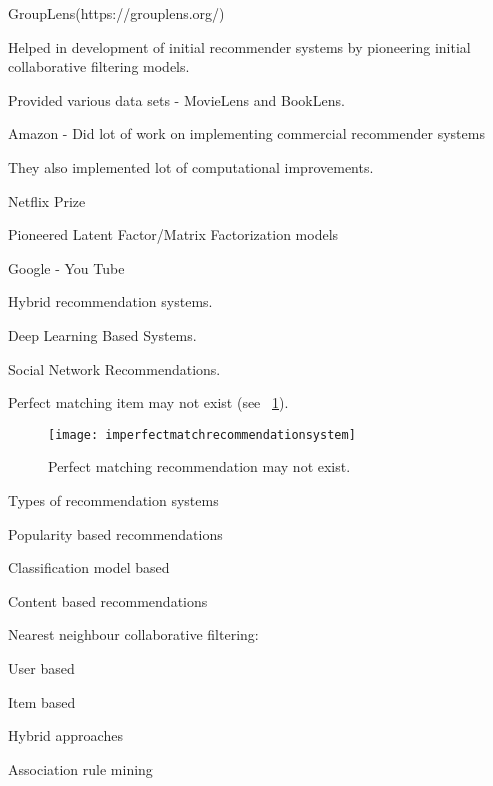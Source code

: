 	\begin{bulletedlist}
		\item GroupLens(https://grouplens.org/)
		\begin{bulletedlist}
			\item Helped in development of initial recommender systems by pioneering initial collaborative filtering models.
			\item Provided various data sets - MovieLens and BookLens.
		\end{bulletedlist}
		\item Amazon - Did lot of work on implementing commercial recommender systems
		\begin{bulletedlist}
			\item They also implemented lot of computational improvements.
		\end{bulletedlist}
		\item Netflix Prize
		\begin{bulletedlist}
			\item Pioneered Latent Factor/Matrix Factorization models
		\end{bulletedlist}
		\item Google - You Tube
		\begin{bulletedlist}
			\item Hybrid recommendation systems.
			\item Deep Learning Based Systems.
		\end{bulletedlist}
		\item Social Network Recommendations.
	\end{bulletedlist}

Perfect matching item may not exist (see \figurename~\ref{fig:imperfectmatchrecommendationsystem}).

	\begin{figure}[tbh]
		\centering
		\texttt{[image: imperfectmatchrecommendationsystem]}
		\caption[Perfect matching recommendation may not exist]{Perfect matching recommendation may not exist.}
		\label{fig:imperfectmatchrecommendationsystem}
	\end{figure}

Types of recommendation systems
	\begin{bulletedlist}
		\item Popularity based recommendations
		\item Classification model based
		\item Content based recommendations
		\item Nearest neighbour collaborative filtering:
		\begin{bulletedlist}
			\item User based
			\item Item based
		\end{bulletedlist}
		\item Hybrid approaches
		\item Association rule mining
	\end{bulletedlist}


